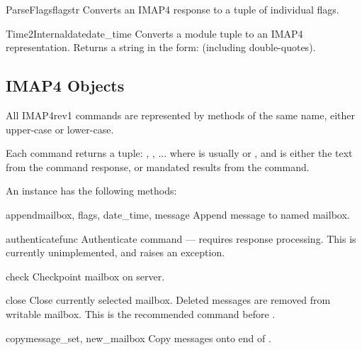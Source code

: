 \begin{funcdesc}{ParseFlags}{flagstr}
  Converts an IMAP4  response to a tuple of individual
  flags.
\end{funcdesc}

\begin{funcdesc}{Time2Internaldate}{date_time}
  Converts a  module tuple to an IMAP4
   representation.  Returns a string in the form:
   (including double-quotes).
\end{funcdesc}


\subsection{IMAP4 Objects}
\label{imap4-objects}

All IMAP4rev1 commands are represented by methods of the same name,
either upper-case or lower-case.

Each command returns a tuple: \code{(}, \code{[},
...\code{])} where  is usually  or ,
and  is either the text from the command response, or
mandated results from the command.

An  instance has the following methods:


\begin{methoddesc}{append}{mailbox, flags, date_time, message}
  Append message to named mailbox. 
\end{methoddesc}

\begin{methoddesc}{authenticate}{func}
  Authenticate command --- requires response processing. This is
  currently unimplemented, and raises an exception. 
\end{methoddesc}

\begin{methoddesc}{check}{}
  Checkpoint mailbox on server. 
\end{methoddesc}

\begin{methoddesc}{close}{}
  Close currently selected mailbox. Deleted messages are removed from
  writable mailbox. This is the recommended command before
  .
\end{methoddesc}

\begin{methoddesc}{copy}{message_set, new_mailbox}
  Copy  messages onto end of . 
\end{methoddesc}


